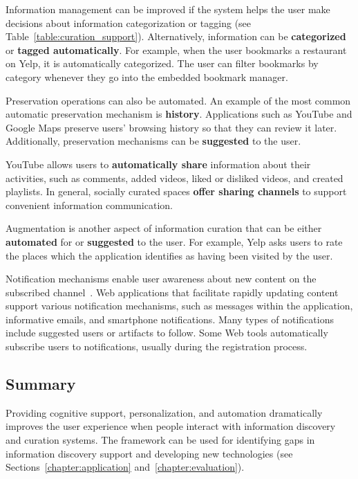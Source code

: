 \documentclass{sigchi}
\begin{document}
{{{Information management can be improved if the system helps the user make decisions about information categorization or tagging (see Table~\ref{table:curation_support}). Alternatively, information can be \textbf{categorized} or \textbf{tagged automatically}. For example, when the user bookmarks a restaurant on Yelp, it is automatically categorized. The user can filter bookmarks by category whenever they go into the embedded bookmark manager. 

Preservation operations can also be automated. An example of the most common automatic preservation mechanism is \textbf{history}. Applications such as YouTube and Google Maps preserve users' browsing history so that they can review it later. Additionally, preservation mechanisms can be \textbf{suggested} to the user.


YouTube allows users to \textbf{automatically share} information about their activities, such as comments,  added videos, liked or disliked videos, and created playlists. In general, socially curated spaces \textbf{offer sharing channels} to support convenient information communication.
 
Augmentation is another aspect of information curation that can be either \textbf{automated} for or \textbf{suggested} to the user. For example, Yelp asks users to rate the places which the application identifies as having been visited by the user. 


Notification mechanisms enable user awareness about new content on the subscribed channel~\cite{millen2005social}. Web applications that facilitate rapidly updating content support various notification mechanisms, such as messages within the application, informative emails, and smartphone notifications. Many types of notifications include suggested users or artifacts to follow. Some Web tools automatically subscribe users to notifications, usually during the registration process.
} %
{\subsection{Summary}
Providing cognitive support, personalization, and automation dramatically improves the user experience when people interact with information discovery and curation systems. The framework can be used for identifying gaps in information discovery support and developing new technologies (see Sections~\ref{chapter:application} and~\ref{chapter:evaluation}).  
}
}

}
\end{document}
